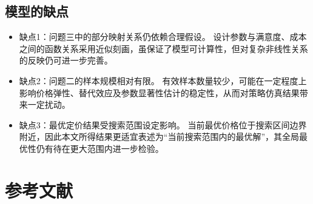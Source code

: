 \documentclass[withoutpreface,bwprint]{cumcmthesis} %
\begin{document}
\subsection{模型的缺点}

\begin{itemize}
    \item {\heiti 缺点1：问题三中的部分映射关系仍依赖合理假设。} 设计参数与满意度、成本之间的函数关系采用近似刻画，虽保证了模型可计算性，但对复杂非线性关系的反映仍可进一步完善。

    \item {\heiti 缺点2：问题二的样本规模相对有限。} 有效样本数量较少，可能在一定程度上影响价格弹性、替代效应及参数显著性估计的稳定性，从而对策略仿真结果带来一定扰动。

    \item {\heiti 缺点3：最优定价结果受搜索范围设定影响。} 当前最优价格位于搜索区间边界附近，因此本文所得结果更适宜表述为“当前搜索范围内的最优解”，其全局最优性仍有待在更大范围内进一步检验。
\end{itemize}


\section*{参考文献}
\end{document}
